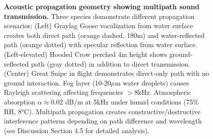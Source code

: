 \documentclass[twocolumn]{article}
\begin{document}
\begin{landscape}
\begin{figure}[p]
\caption{\textbf{Acoustic propagation geometry showing multipath sound transmission.} Three species demonstrate different propagation scenarios: (Left) Graylag Goose vocalization from water surface creates both direct path (orange dashed, 180m) and water-reflected path (orange dotted) with specular reflection from water surface. (Left-elevated) Hooded Crow perched 4m height shows ground-reflected path (gray dotted) in addition to direct transmission. (Center) Great Snipe in flight demonstrates direct-only path with no ground interaction. Fog layer (10-20$\mu$m water droplets) causes Rayleigh scattering affecting frequencies $>$8kHz. Atmospheric absorption $\alpha \approx 0.02$ dB/m at 5kHz under humid conditions (75\% RH, 8°C). Multipath propagation creates constructive/destructive interference patterns depending on path difference and wavelength (see Discussion Section 4.5 for detailed analysis).}
\label{fig:acoustic_propagation}
\end{figure}
\end{landscape}
\end{document}
